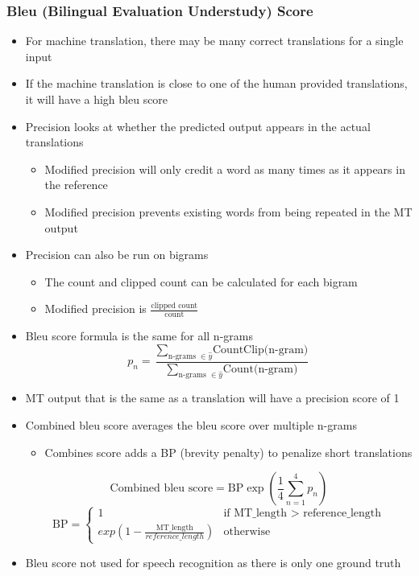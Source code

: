 \documentclass[12pt, letterpaper]{article}
\begin{document}
    \subsubsection{Bleu (Bilingual Evaluation Understudy) Score}
    \begin{itemize}
        \item For machine translation, there may be many correct translations for a single input
        \item If the machine translation is close to one of the human provided translations, it will have a high bleu score
        \item Precision looks at whether the predicted output appears in the actual translations
        \begin{itemize}
            \item Modified precision will only credit a word as many times as it appears in the reference 
            \item Modified precision prevents existing words from being repeated in the MT output
        \end{itemize}
        \item Precision can also be run on bigrams
        \begin{itemize}
            \item The count and clipped count can be calculated for each bigram 
            \item Modified precision is $\frac{\text{clipped count}}{\text{count}}$
        \end{itemize}
        \item Bleu score formula is the same for all n-grams
        $$p_n=\frac{\sum_{\text{n-grams }\in\hat{y}}\text{CountClip(n-gram)}}{\sum_{\text{n-grams }\in\hat{y}}\text{Count(n-gram)}}$$
        \item MT output that is the same as a translation will have a precision score of 1
        \item Combined bleu score averages the bleu score over multiple n-grams
        \begin{itemize}
            \item Combines score adds a BP (brevity penalty) to penalize short translations
        \end{itemize} 
        $$\text{Combined bleu score}=\text{BP}\exp(\frac{1}{4}\sum_{n=1}^4p_n)$$
        $$\text{BP}=\begin{cases}
            1 & \text{if MT\_length > reference\_length} \\
            exp(1-\frac{\text{MT\_length}}{reference\_length}) & \text{otherwise}
        \end{cases}$$
        \item Bleu score not used for speech recognition as there is only one ground truth
    \end{itemize}
\end{document}
